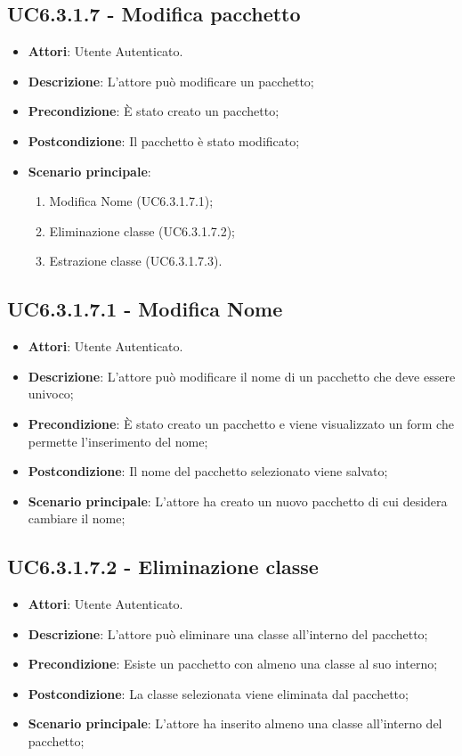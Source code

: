 \subsection{UC6.3.1.7 - Modifica pacchetto} 
\label{ssec:UC6.3.1.7} 
\begin{itemize} 
\item \textbf{Attori}: Utente Autenticato.
\item \textbf{Descrizione}: L'attore può modificare un pacchetto;
\item \textbf{Precondizione}: È stato creato un pacchetto;
\item \textbf{Postcondizione}: Il pacchetto è stato modificato;
\item \textbf{Scenario principale}: \begin{enumerate}\item Modifica Nome (UC6.3.1.7.1);\item Eliminazione classe (UC6.3.1.7.2);\item Estrazione classe (UC6.3.1.7.3). 
 \end{enumerate}
\end{itemize} 
\subsection{UC6.3.1.7.1 - Modifica Nome} 
\label{ssec:UC6.3.1.7.1} 
\begin{itemize} 
\item \textbf{Attori}: Utente Autenticato.
\item \textbf{Descrizione}: L'attore può modificare il nome di un pacchetto che deve essere univoco;
\item \textbf{Precondizione}: È stato creato un pacchetto e viene visualizzato un form che permette l'inserimento del nome;
\item \textbf{Postcondizione}: Il nome del pacchetto selezionato viene salvato;
\item \textbf{Scenario principale}: L'attore ha creato un nuovo pacchetto di cui desidera cambiare il nome;\end{itemize} 
\subsection{UC6.3.1.7.2 - Eliminazione classe} 
\label{ssec:UC6.3.1.7.2} 
\begin{itemize} 
\item \textbf{Attori}: Utente Autenticato.
\item \textbf{Descrizione}: L'attore può eliminare una classe all'interno del pacchetto;
\item \textbf{Precondizione}: Esiste un pacchetto con almeno una classe al suo interno;
\item \textbf{Postcondizione}: La classe selezionata viene eliminata dal pacchetto;
\item \textbf{Scenario principale}: L'attore ha inserito almeno una classe all'interno del pacchetto;\end{itemize} 
